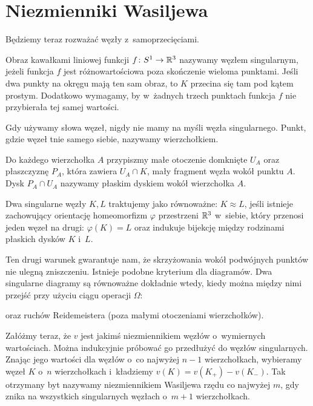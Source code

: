 \section{Niezmienniki Wasiljewa} %
\label{sec:vassiliev}
Będziemy teraz rozważać węzły z~samoprzecięciami.

\begin{definition}
    Obraz kawałkami liniowej funkcji $f \colon S^1 \to \mathbb R^3$ nazywamy węzłem singularnym, jeżeli funkcja $f$ jest różnowartościowa poza skończenie wieloma punktami.
    Jeśli dwa punkty na okręgu mają ten sam obraz, to $K$ przecina się tam pod kątem prostym.
    Dodatkowo wymagamy, by w~żadnych trzech punktach funkcja $f$ nie przybierała tej samej wartości.
\end{definition}

Gdy używamy słowa węzeł, nigdy nie mamy na myśli węzła singularnego.
Punkt, gdzie węzeł tnie samego siebie, nazywamy wierzchołkiem.

Do każdego wierzchołka $A$ przypiszmy małe otoczenie domknięte $U_A$ oraz płaszczyznę $P_A$, która zawiera $U_A \cap K$, mały fragment węzła wokół punktu $A$. Dysk $P_A \cap U_A$ nazywamy płaskim dyskiem wokół wierzchołka $A$.

\begin{definition}
    Dwa singularne węzły $K, L$ traktujemy jako równoważne: $K \approx L$, jeśli istnieje zachowujący orientację homeomorfizm $\varphi$ przestrzeni $\mathbb R^3$ w~siebie, który przenosi jeden węzeł na drugi: $\varphi(K) = L$ oraz indukuje bijekcję między rodzinami płaskich dysków $K$ i~$L$.
\end{definition}

Ten drugi warunek gwarantuje nam, że skrzyżowania wokół podwójnych punktów nie ulegną zniszczeniu.
Istnieje podobne kryterium dla diagramów.
Dwa singularne diagramy są równoważne dokładnie wtedy, kiedy można między nimi przejść przy użyciu ciągu operacji $\Omega$:


oraz ruchów Reidemeistera (poza małymi otoczeniami wierzchołków).

Załóżmy teraz, że $v$ jest jakimś niezmiennikiem węzłów o~wymiernych wartościach.
Można indukcyjnie próbować go przedłużyć do węzłów singularnych.
Znając jego wartości dla węzłów o~co najwyżej $n - 1$ wierzchołkach,  wybieramy węzeł $K$ o~$n$ wierzchołkach i~kładziemy $v(K) = v(K_+) - v(K_-)$.
Tak otrzymany byt nazywamy niezmiennikiem Wasiljewa rzędu co najwyżej $m$, gdy znika na wszystkich singularnych węzłach o~$m + 1$ wierzchołkach.

